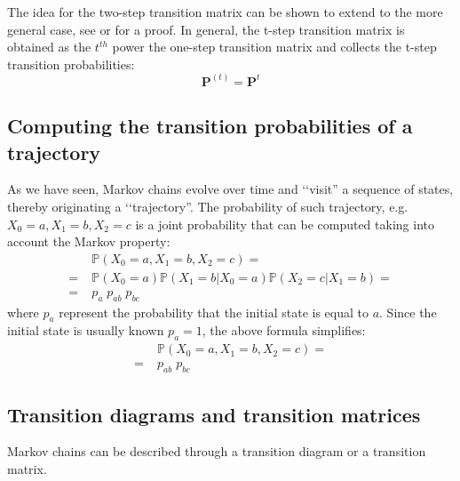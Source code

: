 \documentclass[\main/main.tex]{subfiles}
\begin{document}
The idea for the two-step transition matrix can be shown to extend to the more general case, see \citep{Sheskin2010} or \cite{Holmes2015} for a proof. In general, the t-step transition matrix is obtained as the  $t^{th}$ power the one-step transition matrix and collects the t-step transition probabilities:
\begin{equation}
    \mathbf{P}^{(t)} = \mathbf{P}^t
\end{equation}



\subsection{Computing the transition probabilities of a trajectory}

\noindent As we have seen, Markov chains evolve over time and \lq\lq visit'' a sequence of states, thereby originating a \lq\lq trajectory''. The probability of such trajectory, e.g. $X_0 = a, X_1 = b, X_2 = c$ is a joint probability that can be computed taking into account the Markov property:
\begin{equation}
\begin{split}
   &\mathds{P}(X_0 = a, X_1 = b, X_2 = c) =\\
   =\;  &\mathds{P}(X_0 = a) \mathds{P}(X_1 = b |X_0 = a ) \mathds{P}(X_2 = c |X_1 = b ) = \\
   =\; &p_a \; p_{ab}\; p_{bc}
\end{split}
\end{equation}
where $p_a$ represent the probability that the initial state is equal to $a$. Since the initial state is usually known $p_a = 1$, the above formula simplifies:
\begin{equation}
\begin{split}
   &\mathds{P}(X_0 = a, X_1 = b, X_2 = c) =\\
   =\; &p_{ab}\; p_{bc}
\end{split}
\end{equation}










\subsection{Transition diagrams and transition matrices}

Markov chains can be described through a transition diagram or a transition matrix.
\end{document}
